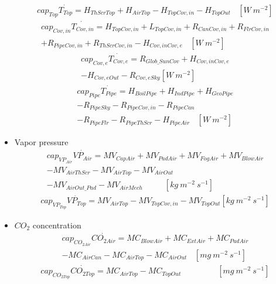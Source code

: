 \documentclass[a4paper]{article}
\numberwithin{equation}{section}
\begin{document}
\begin{itemize}
\begin{multline*}
        \end{multline*}
        \begin{multline*}
          cap_{Top}\dot{T_{Top}} = H_{ThScrTop} + H_{AirTop} - H_{TopCov,in} - H_{TopOut} ~~~~ [W\ m^{-2}]
        \end{multline*}
        \begin{multline*}
          cap_{Cov,in}\dot{T_{Cov,in}} = H_{TopCov,in} + L_{TopCov,in} + R_{CanCov,in} + R_{FlrCov,in} \\
          + R_{PipeCov,in} + R_{ThScrCov,in} - H_{Cov,inCov,e} ~~~~ [W\ m^{-2}]
        \end{multline*}
        \begin{multline*}
          cap_{Cov,e}\dot{T_{Cov,e}} = R_{Glob\_SunCov} + H_{Cov,inCov,e} \\
          - H_{Cov,eOut} - R_{Cov,eSky} [W\ m^{-2}]
        \end{multline*}
        \begin{multline*}
          cap_{Pipe}\dot{T_{Pipe}} = H_{BoilPipe} + H_{IndPipe} + H_{GeoPipe} \\
          - R_{PipeSky} - R_{PipeCov,in} - R_{PipeCan} \\
          - R_{PipeFlr} - R_{PipeThScr} - H_{PipeAir} ~~~~ [W\ m^{-2}]
        \end{multline*}
  \item Vapor pressure
        \begin{multline*}
          cap_{VP_{Air}}\dot{VP_{Air}} = MV_{CapAir} + MV_{PadAir} + MV_{FogAir} + MV_{BlowAir} \\
          - MV_{AirThScr} - MV_{AirTop} - MV_{AirOut} \\
          - MV_{AirOut\_Pad} - MV_{AirMech} ~~~~~~~~~~~~ [kg\ m^{-2}\ s^{-1}]
        \end{multline*}
        \begin{multline*}
          cap_{VP_{Top}}\dot{VP_{Top}} = MV_{AirTop} - MV_{TopCov,in} - MV_{TopOut} [kg\ m^{-2}\ s^{-1}]
        \end{multline*}
  \item \( CO_2 \) concentration
        \begin{multline*}
          cap_{CO_{2Air}}\dot{CO_{2Air}} = MC_{BlowAir} + MC_{ExtAir} + MC_{PadAir} \\
          - MC_{AirCan} - MC_{AirTop} - MC_{AirOut} ~~~~ [mg\ m^{-2}\ s^{-1}]
        \end{multline*}
        \begin{multline*}
          cap_{CO_{2Top}}\dot{CO_{2Top}} = MC_{AirTop} - MC_{TopOut} ~~~~~~~~~~~~~~~~~~~~ [mg\ m^{-2}\ s^{-1}]
        \end{multline*}
\end{itemize}
\end{document}
